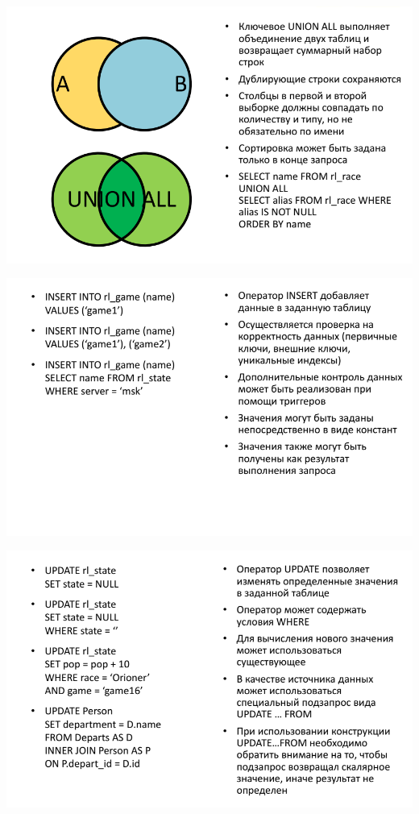 \documentclass{beamer}
\begin{document}
\begin{frame}
	\begin{center}
		\includegraphics[scale=0.5]{images/union.png}
	\end{center}
\end{frame} 

\begin{frame}
	\begin{center}
		\includegraphics[scale=0.5]{images/insert-01.png}
	\end{center}
\end{frame} 

\begin{frame}
	\begin{center}
		\includegraphics[scale=0.5]{images/update-01.png}
	\end{center}
\end{frame} 
\end{document}
